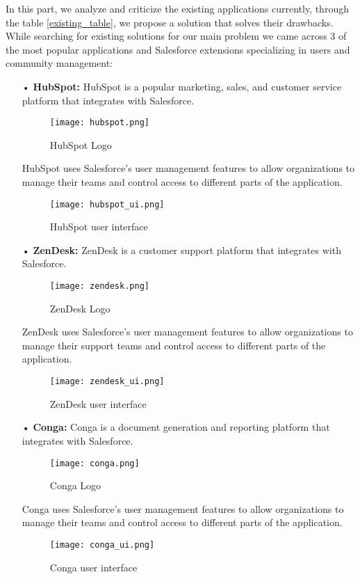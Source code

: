 In this part, we analyze and criticize the existing applications
currently, through the table \ref{existing_table}, we propose a solution that solves
their drawbacks.\\
While searching for existing solutions for our main problem we came across 3 of the most popular applications and Salesforce extensions specializing in users and community management:
\begin{itemize}
\item[•] \textbf{HubSpot:} HubSpot is a popular marketing, sales, and customer service platform that integrates with Salesforce. 
\begin{figure}[H]%
    \center   
    \texttt{[image: hubspot.png]}
    \caption*{HubSpot Logo}
\end{figure}
HubSpot uses Salesforce's user management features to allow organizations to manage their teams and control access to different parts of the application.
\begin{figure}[H]%
    \center   
    \texttt{[image: hubspot\_ui.png]}
    \caption{HubSpot user interface}
\end{figure}
\item[•] \textbf{ZenDesk:} ZenDesk is a customer support platform that integrates with Salesforce. 
\begin{figure}[H]%
    \center   
    \texttt{[image: zendesk.png]}
    \caption*{ZenDesk Logo}
\end{figure}
ZenDesk uses Salesforce's user management features to allow organizations to manage their support teams and control access to different parts of the application.
\begin{figure}[H]%
    \center   
    \texttt{[image: zendesk\_ui.png]}
    \caption{ZenDesk user interface}
\end{figure}
\pagebreak
\item[•] \textbf{Conga:} Conga is a document generation and reporting platform that integrates with Salesforce. 
\begin{figure}[H]%
    \center   
    \texttt{[image: conga.png]}
    \caption*{Conga Logo}
\end{figure}
Conga uses Salesforce's user management features to allow organizations to manage their teams and control access to different parts of the application.
\begin{figure}[H]%
    \center   
    \texttt{[image: conga\_ui.png]}
    \caption{Conga user interface}
\end{figure}
\end{itemize}
